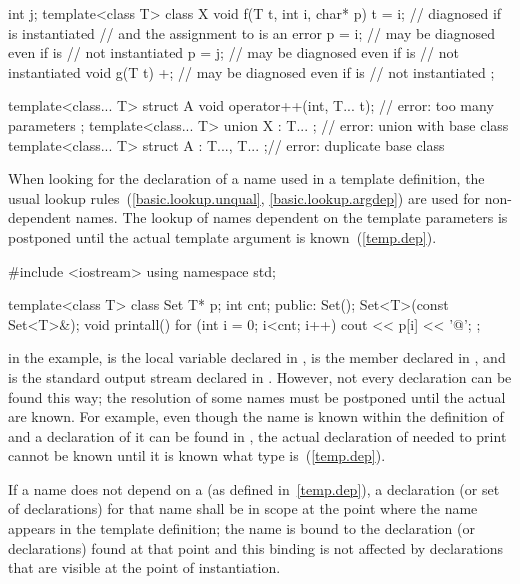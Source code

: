\begin{codeblock}
int j;
template<class T> class X {
  void f(T t, int i, char* p) {
    t = i;          // diagnosed if  is instantiated
                    // and the assignment to  is an error
    p = i;          // may be diagnosed even if  is
                    // not instantiated
    p = j;          // may be diagnosed even if  is
                    // not instantiated
  }
  void g(T t) {
    +;              // may be diagnosed even if  is
                    // not instantiated
  }
};

template<class... T> struct A {
  void operator++(int, T... t);                 // error: too many parameters
};
template<class... T> union X : T... { };        // error: union with base class
template<class... T> struct A : T...,  T... { };// error: duplicate base class
\end{codeblock}
\exitexample

\pnum
When looking for the declaration of a name used in a template definition,
the usual lookup rules~(\ref{basic.lookup.unqual}, \ref{basic.lookup.argdep})
are used for non-dependent names.
The lookup of names dependent on the template parameters
is postponed until the actual template argument is known~(\ref{temp.dep}).
\enterexample

\begin{codeblock}
#include <iostream>
using namespace std;

template<class T> class Set {
  T* p;
  int cnt;
public:
  Set();
  Set<T>(const Set<T>&);
  void printall() {
    for (int i = 0; i<cnt; i++)
      cout << p[i] << '@\textbackslash@n';
  }
};
\end{codeblock}

in the example,
is the local variable
declared in
,
is the member
declared in
,
and
is the standard output stream declared in
.
However, not every declaration can be found this way; the resolution of
some names must be postponed
until the actual
are known.
For example, even though the name
is known within the definition of
and a declaration of it can be found in
,
the actual declaration of
needed to print
cannot be known until it is known what type
is~(\ref{temp.dep}).
\exitexample

\pnum
If a name does not depend on a
(as defined in~\ref{temp.dep}), a declaration (or set of declarations) for that
name shall be in scope at the point where the name appears in the template
definition; the name is bound to the declaration (or declarations) found
at that point and this binding is not affected by declarations that are
visible at the point of instantiation.
\enterexample

